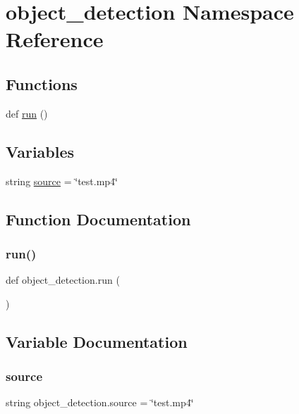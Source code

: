 \hypertarget{namespaceobject__detection}{}\section{object\+\_\+detection Namespace Reference}
\label{namespaceobject__detection}
\subsection*{Functions}
\begin{DoxyCompactItemize}
\item 
def \hyperlink{namespaceobject__detection_ac886c6113cf7df152667022df069933b}{run} ()
\end{DoxyCompactItemize}
\subsection*{Variables}
\begin{DoxyCompactItemize}
\item 
string \hyperlink{namespaceobject__detection_a87cefd1ce51af920f1bb8db85163a31e}{source} = \char`\"{}test.\+mp4\char`\"{}
\end{DoxyCompactItemize}


\subsection{Function Documentation}
\mbox{\label{namespaceobject__detection_ac886c6113cf7df152667022df069933b}} 
\subsubsection{\texorpdfstring{run()}{run()}}
{\footnotesize\ttfamily def object\+\_\+detection.\+run (\begin{DoxyParamCaption}{ }\end{DoxyParamCaption})}



\subsection{Variable Documentation}
\mbox{\label{namespaceobject__detection_a87cefd1ce51af920f1bb8db85163a31e}} 
\subsubsection{\texorpdfstring{source}{source}}
{\footnotesize\ttfamily string object\+\_\+detection.\+source = \char`\"{}test.\+mp4\char`\"{}}

